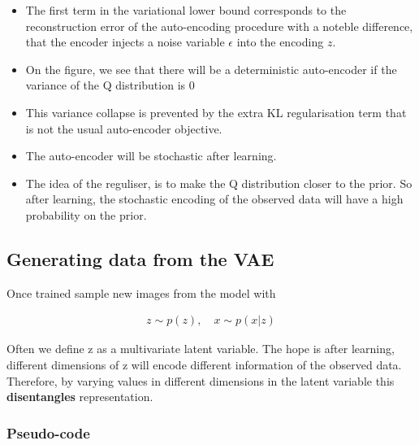 \documentclass[11pt]{article}
\begin{document}
\begin{itemize}
    \item The first term in the variational lower bound corresponds to the reconstruction error of the auto-encoding procedure with a noteble difference, that the encoder injects a noise variable $\epsilon$ into the encoding $z$.
    \item On the figure, we see that there will be a deterministic auto-encoder if the variance of the Q distribution is 0
    \item This variance collapse is prevented by the extra KL regularisation term that is not the usual auto-encoder objective. 
    \item The auto-encoder will be stochastic after learning.
    \item The idea of the reguliser, is to make the Q distribution closer to the prior. So after learning, the stochastic encoding of the observed data will have a high probability on the prior.
\end{itemize}

\subsection{Generating data from the VAE}

Once trained sample new images from the model with 

\begin{gather}
    z \sim p(z), \quad x \sim p(x|z)
\end{gather}

Often we define z as a multivariate latent variable. The hope is after learning, different dimensions of z will encode different information of the observed data. Therefore, by varying values in different dimensions in the latent variable this \textbf{disentangles} representation.

\subsubsection{Pseudo-code}

\begin{figure}[H]
    \centering
\end{figure}
\end{document}
